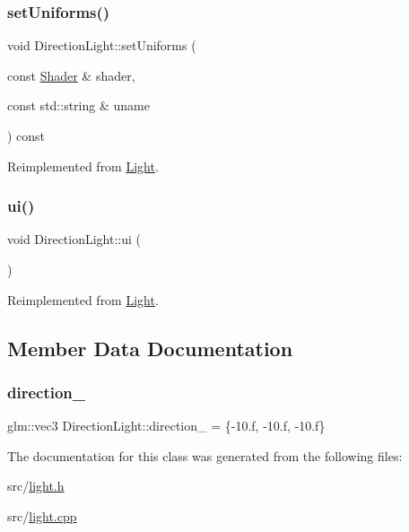 \subsubsection{\texorpdfstring{set\+Uniforms()}{setUniforms()}}
{\footnotesize\ttfamily void Direction\+Light\+::set\+Uniforms (\begin{DoxyParamCaption}\item[{const \hyperlink{classShader}{Shader} \&}]{shader,  }\item[{const std\+::string \&}]{uname }\end{DoxyParamCaption}) const\hspace{0.3cm}{\ttfamily [virtual]}}



Reimplemented from \hyperlink{classLight_adfffa53d21bbeaa638c0bc5ae5a852cc}{Light}.

\mbox{\label{classDirectionLight_a85ac86467a3053dea596b0ebf362b68f}} 
\subsubsection{\texorpdfstring{ui()}{ui()}}
{\footnotesize\ttfamily void Direction\+Light\+::ui (\begin{DoxyParamCaption}{ }\end{DoxyParamCaption})\hspace{0.3cm}{\ttfamily [virtual]}}



Reimplemented from \hyperlink{classLight_a15770d3a4b173cd517477dfb5d5bcab9}{Light}.



\subsection{Member Data Documentation}
\mbox{\label{classDirectionLight_a838d158caa1ed127775a915ff4506861}} 
\subsubsection{\texorpdfstring{direction\+\_\+}{direction\_}}
{\footnotesize\ttfamily glm\+::vec3 Direction\+Light\+::direction\+\_\+ = \{-\/10.f, -\/10.f, -\/10.f\}}



The documentation for this class was generated from the following files\+:\begin{DoxyCompactItemize}
\item 
src/\hyperlink{light_8h}{light.\+h}\item 
src/\hyperlink{light_8cpp}{light.\+cpp}\end{DoxyCompactItemize}
